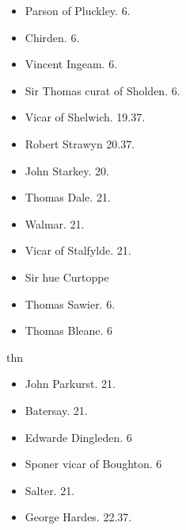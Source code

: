 \documentclass[12pt, a4paper]{book}
\begin{document}
			
				
				\marginpar[\vspace{0.5cm}{\textcolor{Gray}{th}}]{}
			
				
				\marginpar[\vspace{0.5cm}{\textcolor{Gray}{n}}]{}
			
				\begin{itemize}
					\item[]Parson of Pluckley. 6.
					\item[]Chirden. 6.
					\item[]Vincent Ingeam. 6.
					\item[]Sir Thomas curat of Sholden. 6.
				\end{itemize}
				\begin{itemize}
					\item[]Vicar of Shelwich. 19.37.
					\item[]Robert Strawyn 20.37.
					\item[]John Starkey. 20.
					\item[]Thomas Dale. 21.
					\item[]Walmar. 21.
					\item[]Vicar of Stalfylde. 21.
				\end{itemize}
			
			
				
				\marginpar[\vspace{0.5cm}{\textcolor{Gray}{th}}]{}
			
				\begin{itemize}
					\item[]Sir hue Curtoppe
					\item[]Thomas Sawier. 6.
					\item[]Thomas Bleane. 6
				\end{itemize}
				thn
				\begin{itemize}	
					\item[]John Parkurst. 21.
					\item[]Batersay. 21.
				\end{itemize}
			
            		
            			
				\marginpar[\vspace{0.5cm}{\textcolor{Gray}{th}}]{}
			
            			
				\marginpar[\vspace{0.5cm}{\textcolor{Gray}{n}}]{}
			
            			\begin{itemize}
            				\item[]Edwarde Dingleden. 6
            				\item[]Sponer vicar of Boughton. 6
            			\end{itemize}
            			\begin{itemize}
            				\item[]Salter. 21.
            				\item[]George Hardes. 22.37.
            			\end{itemize}
            		
\end{document}
